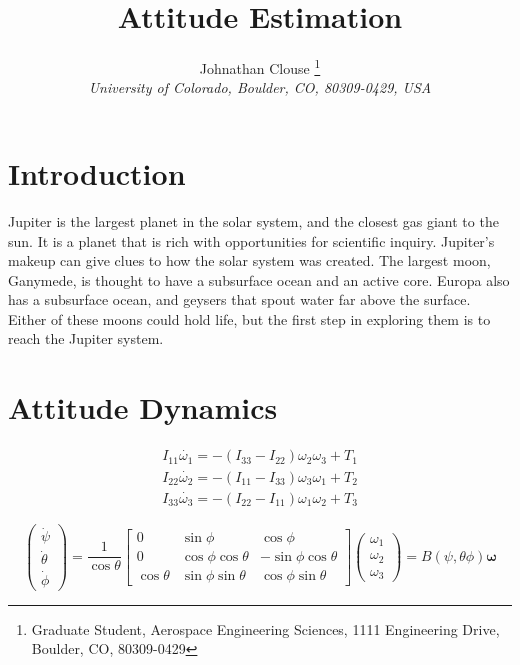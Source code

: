 \documentclass[]{aiaa-tc}%
\title{Attitude Estimation}
\author{
	Johnathan Clouse%
	\thanks{Graduate Student, Aerospace Engineering Sciences, 1111 Engineering Drive, Boulder, CO, 80309-0429}\\
	{\normalsize\itshape
		University of Colorado, Boulder, CO, 80309-0429, USA}
}
\begin{document}
	

	
	\maketitle
	
	\begin{abstract}
		\noindent 
		
	\end{abstract}
	
	\newpage
	
	\tableofcontents
	
	\newpage

	\section{Introduction}
Jupiter is the largest planet in the solar system, and the closest gas giant to the sun. It is a planet that is rich with opportunities for scientific inquiry. Jupiter's makeup can give clues to how the solar system was created. The largest moon, Ganymede, is thought to have a subsurface ocean and an active core. Europa also has a subsurface ocean, and geysers that spout water far above the surface. Either of these moons could hold life, but the first step in exploring them is to reach the Jupiter system.
	
	\section{Attitude Dynamics}
	\begin{equation}
		\begin{matrix}
		I_{11}\dot{\omega_1}=-(I_{33}-I_{22})\omega_2\omega_3+T_1\\ 
		I_{22}\dot{\omega_2}=-(I_{11}-I_{33})\omega_3\omega_1+T_2\\ 
		I_{33}\dot{\omega_3}=-(I_{22}-I_{11})\omega_1\omega_2+T_3
		\end{matrix}
		\label{eqn:EOM}
	\end{equation}

	\begin{equation}		
		\begin{pmatrix}
		\dot{\psi}\\ 
		\dot{\theta}\\ 
		\dot{\phi}
		\end{pmatrix} = 
		\frac{1}{\cos \theta}\begin{bmatrix}
		0 & \sin\phi & \cos\phi \\ 
		0 & \cos\phi\cos\theta & -\sin\phi\cos\theta\\ 
		\cos \theta & \sin\phi\sin\theta & \cos\phi\sin\theta
		\end{bmatrix}
		\begin{pmatrix}
		\omega_1\\ 
		\omega_2\\ 
		\omega_3
		\end{pmatrix}=
		B(\psi,\theta\phi)\boldsymbol{\omega}
		\label{eqn:diffEqEuler}
	\end{equation}
\end{document}
